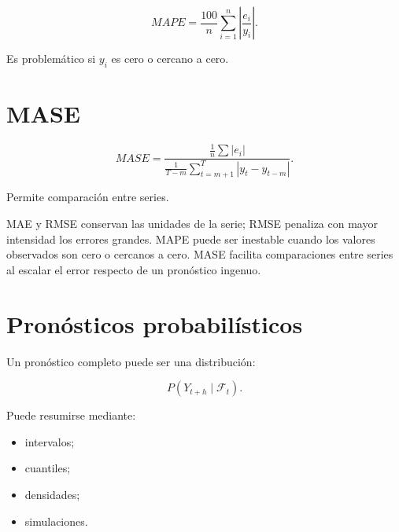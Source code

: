 \documentclass[
  spanish,
  10.5pt,
  letterpaper,
  DIV=11,
  numbers=noendperiod,
  oneside,
  open=any]{scrreprt}
\providecommand{\tightlist}{%
  \setlength{\itemsep}{0pt}\setlength{\parskip}{0pt}}
\theoremstyle{definition}
\theoremstyle{definition}
\theoremstyle{plain}
\theoremstyle{remark}
\begin{document}

\[
MAPE
=
\frac{100}{n}
\sum_{i=1}^{n}
\left|
\frac{e_i}{y_i}
\right|.
\]

Es problemático si \(y_i\) es cero o cercano a cero.

\section*{MASE}\label{mase}


\[
MASE
=
\frac{
\frac{1}{n}\sum|e_i|
}{
\frac{1}{T-m}
\sum_{t=m+1}^{T}|y_t-y_{t-m}|
}.
\]

Permite comparación entre series.

\begin{tcolorbox}[enhanced jigsaw, arc=.35mm, bottomrule=.15mm, bottomtitle=1mm, breakable, colback=white, colbacktitle=quarto-callout-warning-color!10!white, colframe=quarto-callout-warning-color-frame, coltitle=black, left=2mm, leftrule=.75mm, opacityback=0, opacitybacktitle=0.6, rightrule=.15mm, title=\textcolor{quarto-callout-warning-color}{\faExclamationTriangle}\hspace{0.5em}{Precaución al comparar métricas}, titlerule=0mm, toprule=.15mm, toptitle=1mm]

MAE y RMSE conservan las unidades de la serie; RMSE penaliza con mayor
intensidad los errores grandes. MAPE puede ser inestable cuando los
valores observados son cero o cercanos a cero. MASE facilita
comparaciones entre series al escalar el error respecto de un pronóstico
ingenuo.

\end{tcolorbox}

\section*{Pronósticos
probabilísticos}\label{pronuxf3sticos-probabiluxedsticos}


Un pronóstico completo puede ser una distribución:

\[
P(Y_{t+h}\mid\mathcal{F}_t).
\]

Puede resumirse mediante:

\begin{itemize}
\tightlist
\item
  intervalos;
\item
  cuantiles;
\item
  densidades;
\item
  simulaciones.
\end{itemize}
\end{document}
